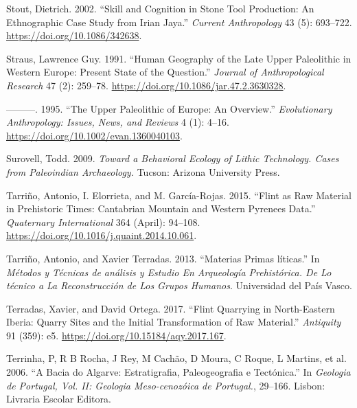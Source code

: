\documentclass[
  a4paper,
  DIV=11,
  numbers=noendperiod]{scrreprt}
\newlength{\cslhangindent}
\newenvironment{CSLReferences}[2] %
 {\begin{list}{}{%
  \setlength{\itemindent}{0pt}
  \setlength{\leftmargin}{0pt}
  \setlength{\parsep}{0pt}
  \ifodd #1
   \setlength{\leftmargin}{\cslhangindent}
   \setlength{\itemindent}{-1\cslhangindent}
  \fi
  \setlength{\itemsep}{#2\baselineskip}}}
 {\end{list}}
\begin{document}
\begin{CSLReferences}{1}{0}
Stout, Dietrich. 2002. {``Skill and {Cognition} in {Stone Tool
Production}: {An Ethnographic Case Study} from {Irian Jaya}.''}
\emph{Current Anthropology} 43 (5): 693--722.
\url{https://doi.org/10.1086/342638}.

Straus, Lawrence Guy. 1991. {``Human Geography of the Late Upper
Paleolithic in Western Europe: Present State of the Question.''}
\emph{Journal of Anthropological Research} 47 (2): 259--78.
\url{https://doi.org/10.1086/jar.47.2.3630328}.

---------. 1995. {``The Upper Paleolithic of Europe: An Overview.''}
\emph{Evolutionary Anthropology: Issues, News, and Reviews} 4 (1):
4--16. \url{https://doi.org/10.1002/evan.1360040103}.

Surovell, Todd. 2009. \emph{Toward a {Behavioral Ecology} of {Lithic
Technology}. {Cases} from {Paleoindian Archaeology}.} Tucson: Arizona
University Press.

Tarriño, Antonio, I. Elorrieta, and M. García-Rojas. 2015. {``Flint as
Raw Material in Prehistoric Times: {Cantabrian Mountain} and {Western
Pyrenees} Data.''} \emph{Quaternary International} 364 (April): 94--108.
\url{https://doi.org/10.1016/j.quaint.2014.10.061}.

Tarriño, Antonio, and Xavier Terradas. 2013. {``Materias Primas
l{í}ticas.''} In \emph{M{é}todos y {T{é}cnicas} de an{á}lisis y Estudio
En Arqueolog{í}a Prehist{ó}rica. {De} Lo t{é}cnico a La Reconstrucci{ó}n
de Los Grupos Humanos}. Universidad del Pa{í}s Vasco.

Terradas, Xavier, and David Ortega. 2017. {``Flint Quarrying in
North-Eastern {Iberia}: Quarry Sites and the Initial Transformation of
Raw Material.''} \emph{Antiquity} 91 (359): e5.
\url{https://doi.org/10.15184/aqy.2017.167}.

Terrinha, P, R B Rocha, J Rey, M Cachão, D Moura, C Roque, L Martins, et
al. 2006. {``{A Bacia do Algarve: Estratigrafia, Paleogeografia e
Tect{ó}nica}.''} In \emph{{Geologia de Portugal, Vol. II: Geologia
Meso-cenoz{ó}ica de Portugal.}}, 29--166. Lisbon: Livraria Escolar
Editora.


\end{CSLReferences}
\end{document}
